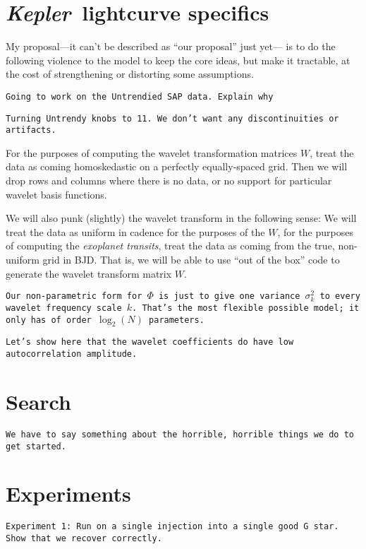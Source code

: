 \documentclass[12pt,letterpaper]{article}
\newcommand{\warning}[1]{\texttt{#1}}
\newcommand{\project}[1]{\textsl{#1}}
\newcommand{\Kepler}{\project{Kepler}}
\newcommand{\variance}{\sigma^2}
\newcommand{\wavetensor}{\Phi}
\newcommand{\weightmatrix}{W}
\begin{document}
\section{\Kepler\ lightcurve specifics}

My proposal---it can't be described as ``our proposal'' just yet---%
is to do the following violence to the model to keep the core ideas,
but make it tractable, at the cost of strengthening or distorting some assumptions.

\warning{Going to work on the Untrendied SAP data.
         Explain why}

\warning{Turning Untrendy knobs to 11.
         We don't want any discontinuities or artifacts.}

For the purposes of computing the wavelet transformation matrices $\weightmatrix$,
treat the data as coming homoskedastic on a perfectly equally-spaced grid.
Then we will drop rows and columns where there is no data,
or no support for particular wavelet basis functions.

We will also punk (slightly) the wavelet transform in the following sense:
We will treat the data as uniform in cadence for the purposes
of the $\weightmatrix$, for the purposes of computing the \emph{exoplanet transits},
treat the data as coming from the true, non-uniform grid in BJD.
That is, we will be able to use ``out of the box'' code to generate the wavelet transform
matrix $\weightmatrix$.

\warning{Our non-parametric form for $\wavetensor$ is just to give one variance $\variance_k$
         to every wavelet frequency scale $k$.
         That's the most flexible possible model;
         it only has of order $\log_2(N)$ parameters.}

\warning{Let's show here that the wavelet coefficients do have low autocorrelation amplitude.}

\section{Search}

\warning{We have to say something about the horrible, horrible things we do to get started.}

\section{Experiments}

\warning{Experiment 1: Run on a single injection into a single good G star.
         Show that we recover correctly.}
\end{document}
